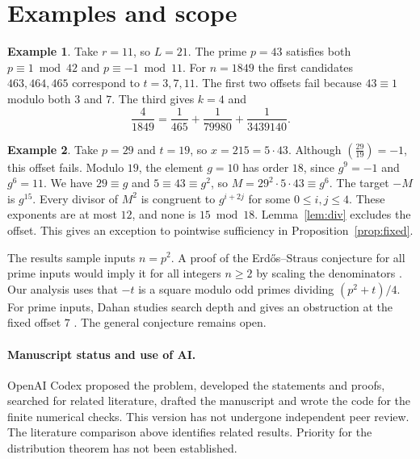 \documentclass[11pt,a4paper]{article}
\theoremstyle{definition}
\newtheorem{example}{Example}
\newcommand{\jac}[2]{\left(\frac{#1}{#2}\right)}
\newcommand{\ES}{Erd\H{o}s--Straus}
\begin{document}
\section{Examples and scope}

\begin{example}
Take \(r=11\), so \(L=21\). The prime \(p=43\) satisfies both
\(p\equiv1\bmod42\) and \(p\equiv-1\bmod11\). For \(n=1849\)
the first candidates \(463,464,465\) correspond to \(t=3,7,11\).
The first two offsets fail because \(43\equiv1\) modulo both \(3\)
and \(7\). The third gives \(k=4\) and
\[
  \frac4{1849}=\frac1{465}+\frac1{79980}+\frac1{3439140}.
\]
\end{example}

\begin{example}
Take \(p=29\) and \(t=19\), so \(x=215=5\cdot43\). Although
\(\jac{29}{19}=-1\), this offset fails. Modulo \(19\), the element
\(g=10\) has order \(18\), since \(g^9=-1\) and \(g^6=11\).
We have \(29\equiv g\) and \(5\equiv43\equiv g^2\), so
\(M=29^2\cdot5\cdot43\equiv g^6\). The target \(-M\) is \(g^{15}\).
Every divisor of \(M^2\) is congruent to \(g^{i+2j}\) for some
\(0\le i,j\le4\). These exponents are at most \(12\), and none is
\(15\bmod18\). Lemma~\ref{lem:div} excludes the offset. This gives
an exception to pointwise sufficiency in Proposition~\ref{prop:fixed}.
\end{example}

The results sample inputs \(n=p^2\). A proof of the \ES{} conjecture
for all prime inputs would imply it for all integers \(n\ge2\) by
scaling the denominators \cite{elsholtztao}. Our analysis uses that
\(-t\) is a square modulo odd primes dividing \((p^2+t)/4\).
For prime inputs, Dahan studies search depth and gives an obstruction
at the fixed offset \(7\) \cite{dahan}. The general conjecture remains
open.

\paragraph{Manuscript status and use of AI.}
OpenAI Codex proposed the problem, developed the statements and proofs,
searched for related literature, drafted the manuscript and wrote the
code for the finite numerical checks.
This version has not undergone
independent peer review. The literature comparison above identifies
related results. Priority for the distribution theorem has not been
established.
\end{document}
